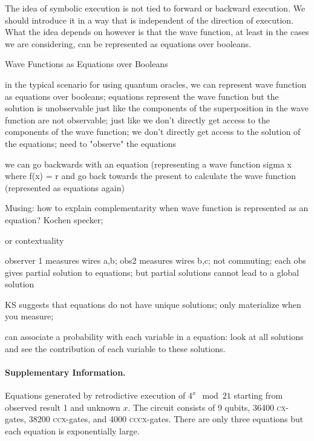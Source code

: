 \documentclass{article}
\newcommand{\cx}{\textsc{cx}}
\newcommand{\ccx}{\textsc{ccx}}
\newcommand{\cccx}{\textsc{cccx}}
\begin{document}
\begin{refsection}
The idea of symbolic execution is not tied to forward or backward
execution. We should introduce it in a way that is independent of the
direction of execution. What the idea depends on however is that the
wave function, at least in the cases we are considering, can be
represented as equations over booleans.

Wave Functions as Equations over Booleans

in the typical scenario for using quantum oracles, we can represent
wave function as equations over booleans; equations represent the wave
function but the solution is unobservable just like the components of
the superposition in the wave function are not observable; just like
we don't directly get access to the components of the wave function;
we don't directly get access to the solution of the equations; need to
"observe" the equations

we can go backwards with an equation (representing a wave function
sigma x where f(x) = r and go back towards the present to calculate
the wave function (represented as equations again)

Musing: how to explain complementarity when wave function is
represented as an equation? Kochen specker;
 
or contextuality
 
observer 1 measures wires a,b; obs2 measures wires b,c; not commuting;
each obs gives partial solution to equations; but partial solutions
cannot lead to a global solution
 
KS suggests that equations do not have unique solutions; only
materialize when you measure;

can associate a probability with each variable in a equation: look at
all solutions and see the contribution of each variable to these
solutions.

\paragraph*{Supplementary Information.} 
\label{par:shor21}

Equations generated by retrodictive execution of $4^x \mod{21}$
starting from observed result 1 and unknown $x$. The circuit consists
of 9 qubits, 36400 \cx-gates, 38200 \ccx-gates, and 4000
\cccx-gates. There are only three equations but each equation is
exponentially large.


\end{refsection}
\end{document}
